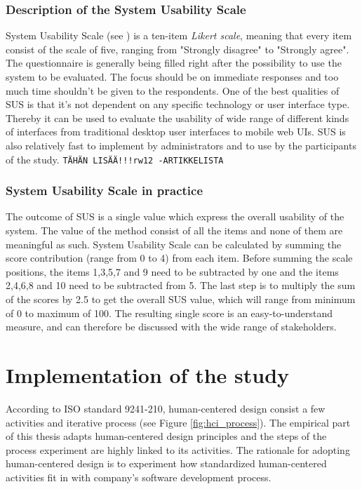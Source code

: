 \documentclass[12pt,a4paper,oneside,pdftex]{report}
\begin{document}
\subsection{Description of the System Usability Scale}
System Usability Scale (see ) is a ten-item \emph{Likert scale}, meaning that every item consist of the scale of five, ranging from "Strongly disagree" to "Strongly agree". The questionnaire is generally being filled right after the possibility to use 		the system to be evaluated. The focus should be on immediate responses and too much time shouldn't be given to the respondents. \cite{RefWorks:10} One of the best qualities of SUS is that it's not dependent on any specific technology or user interface type. Thereby it can be used to evaluate the usability of wide range of different kinds of interfaces from traditional desktop user interfaces to mobile web UIs. SUS is also relatively fast to implement by administrators and to use by the participants of the study. \cite{RefWorks:12}
\texttt{TÄHÄN LISÄÄ!!!rw12 -ARTIKKELISTA}


\subsection{System Usability Scale in practice}
The outcome of SUS is a single value which express the overall usability of the system. The value of the method consist of all the items and none of them are meaningful as such. System Usability Scale can be calculated by summing the score contribution (range from 0 to 4) 		from each item. Before summing the scale positions, the items 1,3,5,7 and 9 need to be subtracted by one and the items 2,4,6,8 and 10 need to be subtracted from 5. The last step is to multiply the sum of the scores by 2.5 to get the overall SUS value, which will range from minimum of 0 to maximum of 100. \cite{RefWorks:10} The resulting single score is an easy-to-understand measure, and can therefore be discussed with the wide range of stakeholders. \cite{RefWorks:12} 
    
\chapter{Implementation of the study}
\label{chapter:implementation}

According to ISO standard 9241-210, human-centered design consist a few activities and iterative process (see Figure \ref{fig:hci_process}). \cite{RefWorks:16} The empirical part of this thesis adapts human-centered design principles and the steps of the process experiment are highly linked to its activities. The rationale for adopting human-centered design is to experiment how standardized human-centered activities fit in with company's software development process.
\end{document}
